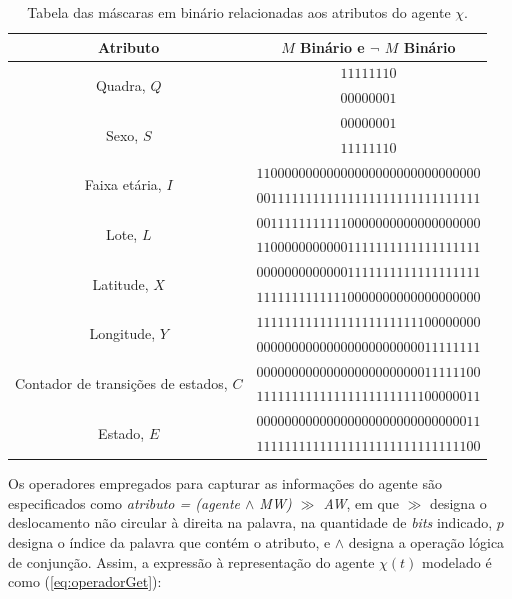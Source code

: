 \begin{table}[H]
\centering
\begin{tabular}{c|c}
 \textbf{Atributo}						& \textbf{$M$ Binário} e \textbf{$\neg$ $M$ Binário} 	 	\\ \hline
 \multirow{2}{*}{Quadra, $Q$}   				& $11111110$    \\
 								& $00000001$	\\
 \multirow{2}{*}{Sexo, $S$}   					& $00000001$    \\
 								& $11111110$ 	\\
 								
 \multirow{2}{*}{Faixa etária, $I$}   				& $11000000000000000000000000000000$    \\
 								& $00111111111111111111111111111111$ 	\\
 \multirow{2}{*}{Lote, $L$}   					& $00111111111110000000000000000000$    \\
 								& $11000000000001111111111111111111$ 	\\
 \multirow{2}{*}{Latitude, $X$}   				& $00000000000001111111111111111111$    \\
 								& $11111111111110000000000000000000$ 	\\
 								
 \multirow{2}{*}{Longitude, $Y$}   				& $11111111111111111111111100000000$    \\
 								& $00000000000000000000000011111111$ 	\\
 \multirow{2}{*}{Contador de transições de estados, $C$}	& $00000000000000000000000011111100$    \\
 								& $11111111111111111111111100000011$ 	\\
 \multirow{2}{*}{Estado, $E$}   				& $00000000000000000000000000000011$    \\
 								& $11111111111111111111111111111100$ 	\\
\end{tabular}
\caption{Tabela das máscaras em binário relacionadas aos atributos do agente $\chi$.}
\label{tab:mascarasBinario}
\end{table}

Os operadores empregados para capturar as informações do agente são especificados como \textit{atributo = (agente $\wedge$ MW) $\gg$ AW}, em que $\gg$ designa o deslocamento não circular à direita na palavra, na quantidade de \textit{bits} indicado, $p$ designa o índice da palavra que contém o atributo, e $\wedge$ designa a operação lógica de conjunção. Assim, a expressão à representação do agente $\chi(t)$ modelado é como (\ref{eq:operadorGet}):

